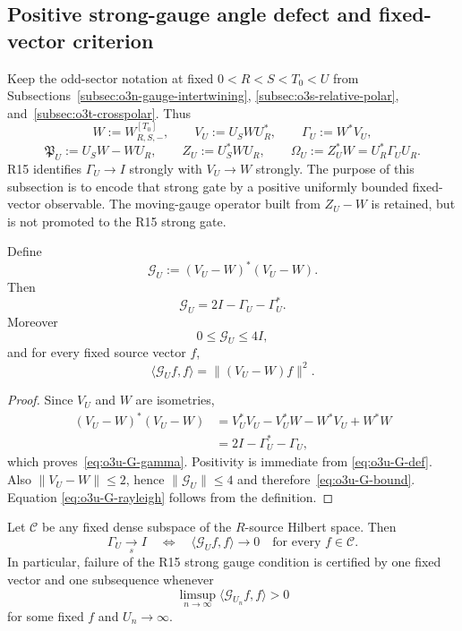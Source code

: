 
\subsection{Positive strong-gauge angle defect and fixed-vector criterion}
\label{subsec:o3u-angle-defect}

Keep the odd-sector notation at fixed $0<R<S<T_0<U$ from
Subsections~\ref{subsec:o3n-gauge-intertwining},
\ref{subsec:o3s-relative-polar}, and~\ref{subsec:o3t-crosspolar}.  Thus
\[
 W:=W_{R,S,-}^{[T_0]},
 \qquad
 V_U:=U_SWU_R^*,
 \qquad
 \Gamma_U:=W^*V_U,
\]
\[
 \mathfrak P_U:=U_SW-WU_R,
 \qquad
 Z_U:=U_S^*WU_R,
 \qquad
 \Omega_U:=Z_U^*W=U_R^*\Gamma_UU_R.
\]
R15 identifies $\Gamma_U\to I$ strongly with $V_U\to W$ strongly.  The purpose of
this subsection is to encode that strong gate by a positive uniformly bounded
fixed-vector observable.  The moving-gauge operator built from $Z_U-W$ is retained,
but is not promoted to the R15 strong gate.

\begin{proposition}
\label{prop:o3u-true-angle}
Define
\[
 \boxed{
 \mathscr G_U:=(V_U-W)^*(V_U-W).
 }
\tag{O3U.1}\label{eq:o3u-G-def}
\]
Then
\[
 \boxed{
 \mathscr G_U=2I-\Gamma_U-\Gamma_U^*.
 }
\tag{O3U.2}\label{eq:o3u-G-gamma}
\]
Moreover
\[
 \boxed{0\le\mathscr G_U\le4I,}
\tag{O3U.3}\label{eq:o3u-G-bound}
\]
and for every fixed source vector $f$,
\[
 \boxed{
 \langle\mathscr G_Uf,f\rangle
 =\|(V_U-W)f\|^2.
 }
\tag{O3U.4}\label{eq:o3u-G-rayleigh}
\]
\end{proposition}

\begin{proof}
Since $V_U$ and $W$ are isometries,
\[
\begin{aligned}
 (V_U-W)^*(V_U-W)
 &=V_U^*V_U-V_U^*W-W^*V_U+W^*W\\
 &=2I-\Gamma_U^*-\Gamma_U,
\end{aligned}
\]
which proves~\eqref{eq:o3u-G-gamma}.  Positivity is immediate from
\eqref{eq:o3u-G-def}.  Also $\|V_U-W\|\le2$, hence
$\|\mathscr G_U\|\le4$ and therefore~\eqref{eq:o3u-G-bound}.  Equation
\eqref{eq:o3u-G-rayleigh} follows from the definition.
\end{proof}

\begin{proposition}
\label{prop:o3u-dense-core}
Let $\mathcal C$ be any fixed dense subspace of the $R$-source Hilbert space.  Then
\[
 \boxed{
 \Gamma_U\xrightarrow[s]{}I
 \quad\Longleftrightarrow\quad
 \langle\mathscr G_Uf,f\rangle\longrightarrow0
 \quad\text{for every }f\in\mathcal C.
 }
\tag{O3U.5}\label{eq:o3u-dense-core}
\]
In particular, failure of the R15 strong gauge condition is certified by one fixed
vector and one subsequence whenever
\[
 \boxed{
 \limsup_{n\to\infty}
 \langle\mathscr G_{U_n}f,f\rangle>0
 }
\tag{O3U.6}\label{eq:o3u-fixed-witness}
\]
for some fixed $f$ and $U_n\to\infty$.
\end{proposition}

